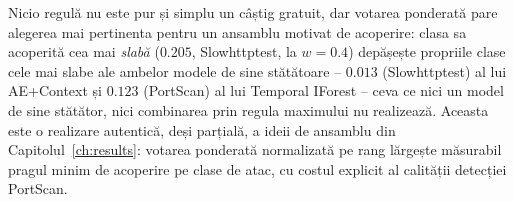 Nicio regulă nu este pur și simplu un câștig gratuit, dar votarea ponderată pare alegerea mai pertinenta pentru un ansamblu motivat de acoperire: clasa sa acoperită cea mai \emph{slabă} ($0.205$, Slowhttptest, la $w=0.4$) depășește propriile clase cele mai slabe ale ambelor modele de sine stătătoare -- $0.013$ (Slowhttptest) al lui AE+Context și $0.123$ (PortScan) al lui Temporal IForest -- ceva ce nici un model de sine stătător, nici combinarea prin regula maximului nu realizează.
Aceasta este o realizare autentică, deși parțială, a ideii de ansamblu din Capitolul~\ref{ch:results}: votarea ponderată normalizată pe rang lărgește măsurabil pragul minim de acoperire pe clase de atac, cu costul explicit al calității detecției PortScan.
